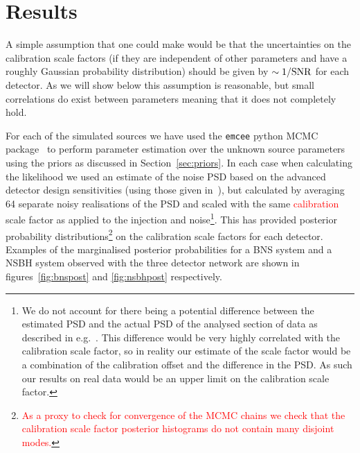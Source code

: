 \documentclass[prd, twocolumn, lengthcheck, superscriptaddress, showpacs, letterpaper, nofootinbib]{revtex4-1}
\newcommand{\refresp}[1]{\textcolor{red}{#1}}
\begin{document}
\section{Results}\label{sec:results}

A simple assumption that one could make would be that the uncertainties on the
calibration scale factors (if they are independent of other parameters and have
a roughly Gaussian probability distribution) should be given by $\sim 1/{\rm
SNR}$ for each detector. As we will show below this assumption is reasonable,
but small correlations do exist between parameters meaning that it does not
completely hold.

For each of the simulated sources we have used the {\tt emcee} python \ac{MCMC}
package~\cite{2013PASP..125..306F} to perform parameter estimation over the
unknown source parameters using the priors as discussed in
Section~\ref{sec:priors}. In each case when calculating the likelihood we used
an estimate of the noise \ac{PSD} based on the advanced detector design
sensitivities (using those given in~\cite{2013arXiv1304.0670L}), but calculated by averaging 
64 separate noisy realisations of the \ac{PSD} and scaled
with the same \refresp{calibration} scale factor as applied to the injection and noise\footnote{We do not account for there 
being a potential difference
between the estimated \ac{PSD} and the actual \ac{PSD} of the analysed section
of data as described in e.g.\ \cite{2013PhRvD..88h4044L}. This difference would
be very highly correlated with the calibration scale factor, so in reality our
estimate of the scale factor would be a combination of the calibration offset
and the difference in the \ac{PSD}. As such our results on real data would be
an upper limit on the calibration scale factor.}. This has provided posterior probability
distributions\refresp{\footnote{\refresp{As a proxy to check for convergence of the MCMC chains
we check that the calibration scale factor posterior histograms do not contain many disjoint modes.}}}
on the calibration scale factors for each detector.  Examples of
the marginalised posterior probabilities for a \ac{BNS} system and a \ac{NSBH}
system observed with the three detector network are shown in
figures~\ref{fig:bnspost} and \ref{fig:nsbhpost} respectively.
\end{document}
